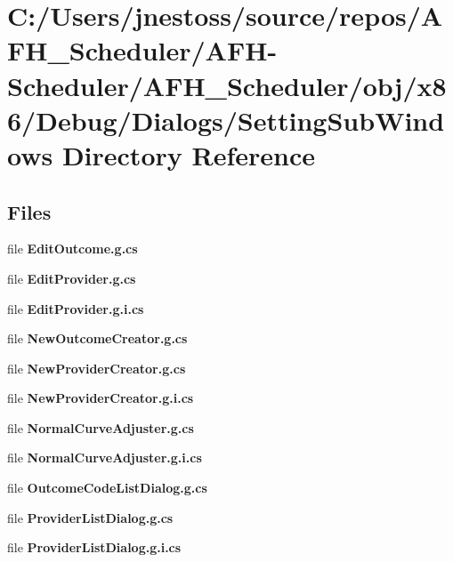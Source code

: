 \section{C\+:/\+Users/jnestoss/source/repos/\+A\+F\+H\+\_\+\+Scheduler/\+A\+F\+H-\/\+Scheduler/\+A\+F\+H\+\_\+\+Scheduler/obj/x86/\+Debug/\+Dialogs/\+Setting\+Sub\+Windows Directory Reference}
\label{dir_5d6f57637ca29dcd6ce682944c07657a}
\subsection*{Files}
\begin{DoxyCompactItemize}
\item 
file \textbf{ Edit\+Outcome.\+g.\+cs}
\item 
file \textbf{ Edit\+Provider.\+g.\+cs}
\item 
file \textbf{ Edit\+Provider.\+g.\+i.\+cs}
\item 
file \textbf{ New\+Outcome\+Creator.\+g.\+cs}
\item 
file \textbf{ New\+Provider\+Creator.\+g.\+cs}
\item 
file \textbf{ New\+Provider\+Creator.\+g.\+i.\+cs}
\item 
file \textbf{ Normal\+Curve\+Adjuster.\+g.\+cs}
\item 
file \textbf{ Normal\+Curve\+Adjuster.\+g.\+i.\+cs}
\item 
file \textbf{ Outcome\+Code\+List\+Dialog.\+g.\+cs}
\item 
file \textbf{ Provider\+List\+Dialog.\+g.\+cs}
\item 
file \textbf{ Provider\+List\+Dialog.\+g.\+i.\+cs}
\end{DoxyCompactItemize}
